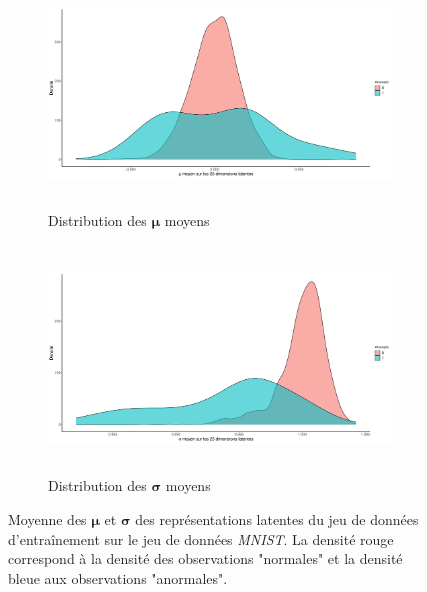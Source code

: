 \begin{figure}[H]
	\centering
	\begin{subfigure}{12cm}
		\centering\includegraphics[width=12cm, height=6cm]{images/latent_stats/plot_mu_mnist}
		\caption{Distribution des $\boldsymbol{\mu}$ moyens}
	\end{subfigure}
	\begin{subfigure}{12cm}
		\centering\includegraphics[width=12cm, height=6cm]{images/latent_stats/plot_sigma_mnist}
		\caption{Distribution des $\boldsymbol{\sigma}$ moyens}
	\end{subfigure}
	\caption[Moyenne des $\boldsymbol{\mu}$ et $\boldsymbol{\sigma}$ des représentations latentes du jeu de données d'entraînement sur le jeu de données \textit{MNIST}.]{Moyenne des $\boldsymbol{\mu}$ et $\boldsymbol{\sigma}$ des représentations latentes du jeu de données d'entraînement sur le jeu de données \textit{MNIST}. La densité rouge correspond à la densité des observations "normales" et la densité bleue aux observations "anormales".}
	\label{fig:mnist_latent_stats}
\end{figure}

